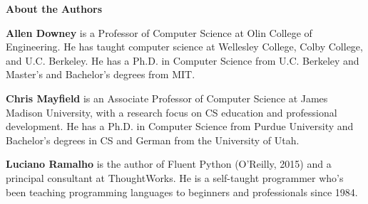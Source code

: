 \documentclass[12pt]{book}
\theoremstyle{exercise}
\begin{document}

\fi



\mainmatter




\appendix
{}

\renewcommand{\chaptermark}[1]{\markboth{Appendix \thechapter ~~ #1}{}}





\backmatter

\printindex

\newpage
\thispagestyle{empty}

\vspace*{64pt}

{\bf\huge About the Authors}

\vspace*{40pt}

{\bf Allen Downey} is a Professor of Computer Science at Olin College of Engineering.
He has taught computer science at Wellesley College, Colby College, and U.C. Berkeley.
He has a Ph.D. in Computer Science from U.C. Berkeley and Master's and Bachelor's degrees from MIT.

{\bf Chris Mayfield} is an Associate Professor of Computer Science at James Madison University, with a research focus on CS education and professional development.
He has a Ph.D. in Computer Science from Purdue University and Bachelor's degrees in CS and German from the University of Utah.

{\bf Luciano Ramalho} is the author of Fluent Python (O'Reilly, 2015) and a principal consultant at ThoughtWorks.
He is a self-taught programmer who's been teaching programming languages to beginners and professionals since 1984.
\end{document}
